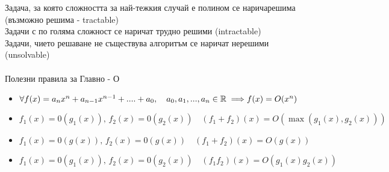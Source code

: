 \documentclass[fleqn, 12pt]{article}
\theoremstyle{definition}
\begin{document}
Задача, за която сложността за най-тежкия случай е полином се наричарешима (възможно решима - tractable)\\
Задачи с по голяма сложност се наричат трудно решими (intractable)\\
Задачи, чието решаване не съществува алгоритъм се наричат нерешими (unsolvable)\\
\\
Полезни правила за Главно - О 
\begin{itemize}
\item $\forall f(x) = a_n x^n + a_{n-1} x^{n-1} + .... + a_0, \quad a_0, a_1 , ..., a_n \in \mathbb{R} \implies \\
f(x) = O(x^n)$ 
\item $f_1 (x) = 0(g_1(x)), \, f_2 (x) = 0(g_2(x)) \quad (f_1 + f_2)(x) = O(\max (g_1(x), g_2(x)))$
\item $f_1 (x) = 0(g(x)), \, f_2 (x) = 0(g(x)) \quad (f_1 + f_2)(x) = O(g(x))$
\item $f_1 (x) = 0(g_1(x)), \, f_2 (x) = 0(g_2(x)) \quad (f_1f_2)(x) = O (g_1(x)g_2(x))$
\end{itemize}
\end{document}
